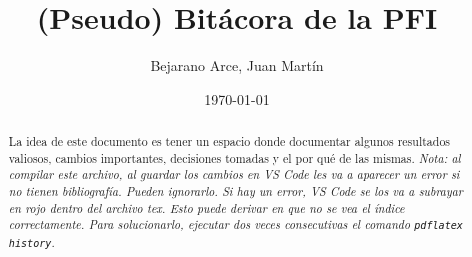 \documentclass[a4paper,12pt]{article}
\begin{document}
\title{(Pseudo) Bit\'acora de la PFI}
\author{Bejarano Arce, Juan Martín}
\date{\today}
\maketitle

\begin{abstract}
    La idea de este documento es tener un espacio donde documentar algunos resultados valiosos, cambios importantes, decisiones tomadas y el por qu\'e de las mismas.
    \emph{Nota: al compilar este archivo, al guardar los cambios en VS Code les va a aparecer un error si no tienen bibliografía. Pueden ignorarlo. Si hay un error, VS Code se los va a subrayar en rojo dentro del archivo tex. Esto puede derivar en que no se vea el índice correctamente. Para solucionarlo, ejecutar dos veces consecutivas el comando \texttt{pdflatex history}}.
\end{abstract}

\tableofcontents
\newpage

 \newpage
 \newpage
 \newpage
 \newpage
 \newpage
 \newpage
 \newpage
 \newpage
 \newpage








\end{document}
